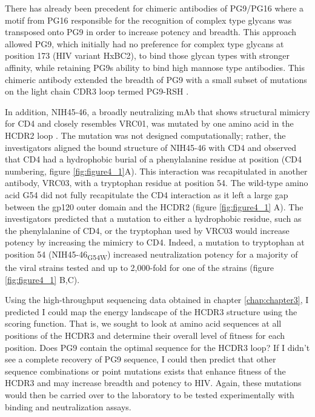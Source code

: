 There has already been precedent for chimeric antibodies of PG9/PG16 where a motif from PG16 responsible for the recognition of complex type glycans was transposed onto PG9 in order to increase potency and breadth. This approach allowed PG9, which initially had no preference for complex type glycans at position 173 (HIV variant HxBC2), to bind those glycan types with stronger affinity, while retaining PG9s ability to bind high mannose type antibodies. This chimeric antibody extended the breadth of PG9 with a small subset of mutations on the light chain CDR3 loop termed PG9-RSH \citep{Pancera:2013ev}.

In addition, NIH45-46, a broadly neutralizing mAb that shows structural mimicry for CD4 and closely resembles VRC01, was mutated by one amino acid in the HCDR2 loop \citep{Scheid:2011js,Diskin:2011hl}. The mutation was not designed computationally; rather, the investigators aligned the bound structure of NIH45-46 with CD4 and observed that CD4 had a hydrophobic burial of a phenylalanine residue at position (CD4 numbering, figure \ref{fig:figure4_1}A). This interaction was recapitulated in another antibody, VRC03, with a tryptophan residue at position 54. The wild-type amino acid G54 did not fully recapitulate the CD4 interaction as it left a large gap between the gp120 outer domain and the HCDR2 (figure \ref{fig:figure4_1} A). The investigators predicted that a mutation to either a hydrophobic residue, such as the phenylalanine of CD4, or the tryptophan used by VRC03 would increase potency by increasing the mimicry to CD4. Indeed, a mutation to tryptophan at position 54 (NIH45-46\textsubscript{G54W}) increased neutralization potency for a majority of the viral strains tested and up to 2,000-fold for one of the strains (figure \ref{fig:figure4_1} B,C).

Using the high-throughput sequencing data obtained in chapter \ref{chap:chapter3}, I predicted I could map the energy landscape of the HCDR3 structure using the \rosetta scoring function. That is, we sought to look at amino acid sequences at all positions of the HCDR3 and determine their overall level of fitness for each position. Does PG9 contain the optimal sequence for the HCDR3 loop? If I didn't see a complete recovery of PG9 sequence, I could then predict that other sequence combinations or point mutations exists that enhance fitness of the HCDR3 and may increase breadth and potency to HIV. Again, these mutations would then be carried over to the laboratory to be tested experimentally with binding and neutralization assays.

